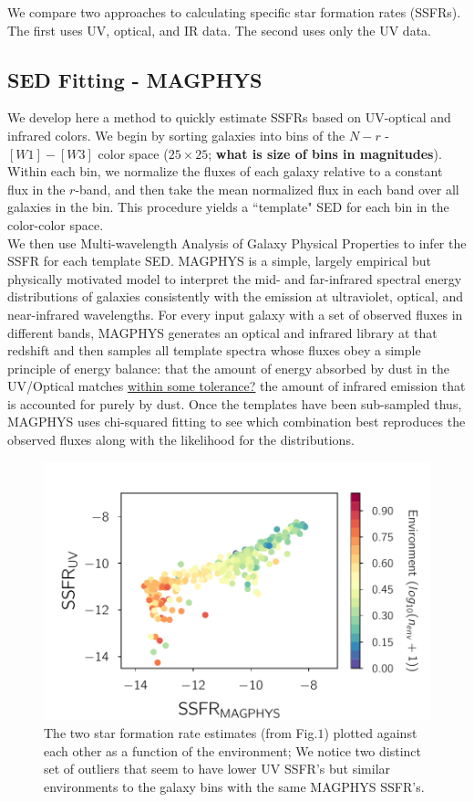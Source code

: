 \documentclass[iop]{emulateapj}
\begin{document}
We compare two approaches to calculating specific star formation rates (SSFRs). 
The first uses UV, optical, and IR data. The second uses only the UV data.

\subsection{SED Fitting - MAGPHYS}

We develop here a method to quickly estimate SSFRs based on UV-optical
and infrared colors. We begin by sorting galaxies into bins of the 
$N-r$ - $[W1]-[W3]$ color space ($25\times25$; \textbf{what is size of
bins in magnitudes}). Within each bin, we normalize the fluxes of 
each galaxy relative to a constant flux in the $r$-band, and then 
take the mean normalized flux in each band over all galaxies in the 
bin. This procedure yields a ``template" SED for each bin in the 
color-color space.\\

We then use Multi-wavelength Analysis of Galaxy Physical Properties 
\cite[MAGPHYS]{daC08} to infer the SSFR for each template SED. MAGPHYS
is a simple, largely empirical but physically motivated model to 
interpret the mid- and far-infrared spectral energy distributions
of galaxies consistently with the emission at ultraviolet, optical,
and near-infrared wavelengths. For every input galaxy with a set 
of observed fluxes in different bands, MAGPHYS generates an 
optical and infrared library at that redshift and then samples 
all template spectra whose fluxes obey a simple principle of 
energy balance: that the amount of energy absorbed by dust 
in the UV/Optical matches \underline{within some tolerance?} 
the amount of infrared emission that is accounted for purely 
by dust. Once the templates have been sub-sampled thus, 
MAGPHYS uses chi-squared fitting to see which combination 
best reproduces the observed fluxes along with the likelihood 
for the distributions.\\

\begin{figure}
	\centering
		\includegraphics[width = 9 cm, height = 6.0 cm]{2_env_plot.pdf}
	\caption{The two star formation rate estimates (from Fig.$1$) plotted against each other as a function of the environment; We notice two distinct set of outliers that seem to have lower UV SSFR's but similar environments to the galaxy bins with the same MAGPHYS SSFR's.} 
\end{figure}
\end{document}
